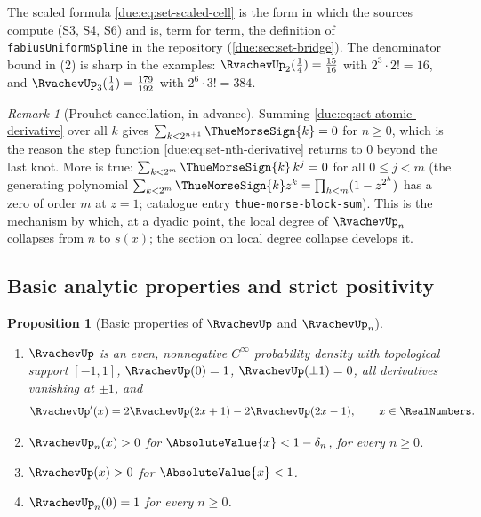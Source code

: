 \documentclass[11pt,oneside]{article}
\theoremstyle{plain}
\newtheorem{proposition}[theorem]{Proposition}
\theoremstyle{definition}
\theoremstyle{remark}
\newtheorem{remark}[theorem]{Remark}
\newcommand{\upn}[1]{\RvachevUp_{#1}}
\newcommand{\dep}[1]{s\!\left(#1\right)}                    %
\begin{document}
The scaled formula \cref{due:eq:set-scaled-cell} is the form in which the
sources compute (S3, S4, S6) and is, term for term, the definition of
\texttt{fabiusUniformSpline} in the repository
(\cref{due:sec:set-bridge}).  The denominator bound in (2) is sharp in the
examples: $\upn{2}(\tfrac14)=\tfrac{15}{16}$ with
$2^{3}\cdot2!=16$, and $\upn{3}(\tfrac14)=\tfrac{179}{192}$ with
$2^{6}\cdot3!=384$.

\begin{remark}[Prouhet cancellation, in advance]
\label{due:rmk:set-prouhet}
Summing \cref{due:eq:set-atomic-derivative} over all $k$ gives
$\sum_{k<2^{n+1}}\ThueMorseSign{k}=0$ for $n\ge0$, which is the reason the
step function \cref{due:eq:set-nth-derivative} returns to $0$ beyond the
last knot.  More is true: $\sum_{k<2^{m}}\ThueMorseSign{k}\,k^{j}=0$ for all
$0\le j<m$ (the generating polynomial
$\sum_{k<2^{m}}\ThueMorseSign{k}z^{k}=\prod_{h<m}(1-z^{2^{h}})$ has a zero of
order $m$ at $z=1$; catalogue entry \texttt{thue-morse-block-sum}).  This is
the mechanism by which, at a dyadic point, the local degree of $\upn{n}$
collapses from $n$ to $\dep{x}$; the section on local degree collapse
develops it.
\end{remark}

\subsection{Basic analytic properties and strict positivity}
\label{due:sec:set-basic}

\begin{proposition}[Basic properties of $\RvachevUp$ and $\upn{n}$]
\label{due:prop:set-basic}
\begin{enumerate}
\item $\RvachevUp$ is an even, nonnegative $C^{\infty}$ probability density
      with topological support $[-1,1]$, $\RvachevUp(0)=1$,
      $\RvachevUp(\pm1)=0$, all derivatives vanishing at $\pm1$, and
      \begin{equation}
       \RvachevUp'(x)=2\RvachevUp(2x+1)-2\RvachevUp(2x-1),
       \qquad x\in\RealNumbers .
       \label{due:eq:set-differential-law}
      \end{equation}
\item $\upn{n}(x)>0$ for $\AbsoluteValue{x}<1-\delta_n$, for every $n\ge0$.
\item $\RvachevUp(x)>0$ for $\AbsoluteValue{x}<1$.
\item $\upn{n}(0)=1$ for every $n\ge0$.
\end{enumerate}
\end{proposition}
\end{document}
